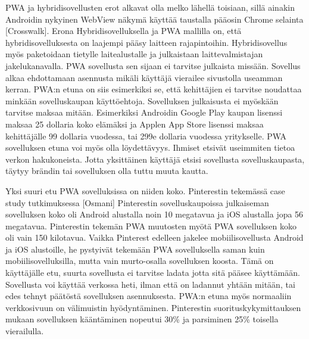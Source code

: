 \documentclass{tktltiki}
\begin{document}
PWA ja hybridisovellusten erot alkavat olla melko lähellä toisiaan, sillä ainakin Androidin nykyinen WebView näkymä käyttää taustalla pääosin Chrome selainta [Crosswalk]. Erona Hybridisovelluksella ja PWA mallilla on, että hybridisovelluksesta on laajempi pääsy laitteen rajapintoihin. Hybridisovellus myös paketoidaan tietylle laitealustalle ja julkaistaan laittevalmistajan jakelukanavalla. PWA sovellusta sen sijaan ei tarvitse julkaista missään. Sovellus alkaa ehdottamaan asennusta mikäli käyttäjä vierailee sivustolla useamman kerran. PWA:n etuna on siis esimerkiksi se, että kehittäjien ei tarvitse noudattaa minkään sovelluskaupan käyttöehtoja. Sovelluksen julkaisusta ei myöskään tarvitse maksaa mitään. Esimerkiksi Androidin Google Play kaupan lisenssi maksaa 25 dollaria koko elämäksi ja Applen App Store lisenssi maksaa kehittäjälle 99 dollaria vuodessa, tai 299e dollaria vuodessa yritykselle. PWA sovelluksen etuna voi myös olla löydettävyys. Ihmiset etsivät useimmiten tietoa verkon hakukoneista. Jotta yksittäinen käyttäjä etsisi sovellusta sovelluskaupasta, täytyy brändin tai sovelluksen olla tuttu muuta kautta. 

Yksi suuri etu PWA sovelluksissa on niiden koko. Pinterestin tekemässä case study tutkimuksessa [Osmani] Pinterestin sovelluskaupoissa julkaiseman sovelluksen koko oli Android alustalla noin 10 megatavua ja iOS alustalla jopa 56 megatavua. Pinterestin tekemän PWA muutosten myötä PWA sovelluksen koko oli vain 150 kilotavua. Vaikka Pinterest edelleen jakelee mobiilisovellusta Android ja iOS alustoille, he pystyivät tekemään PWA sovelluksella saman kuin mobiilisovelluksilla, mutta vain murto-osalla sovelluksen koosta. Tämä on käyttäjälle etu, suurta sovellusta ei tarvitse ladata jotta sitä pääsee käyttämään. Sovellusta voi käyttää verkossa heti, ilman että on ladannut yhtään mitään, tai edes tehnyt päätöstä sovelluksen asennuksesta. PWA:n etuna myös normaaliin verkkosivuun on välimuistin hyödyntäminen. Pinterestin suorituskykymittauksen mukaan sovelluksen kääntäminen nopeutui 30\% ja parsiminen 25\% toisella vierailulla.  

\clearpage
\end{document}
